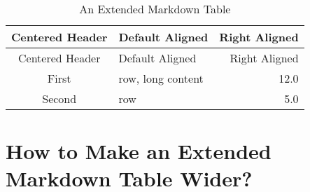 \documentclass[10pt, a4paper, oneside]{article}
\begin{document}
\begin{longtable}[c]{@{}clr@{}}
\caption{An Extended Markdown Table}\tabularnewline
\toprule
\begin{minipage}[b]{0.14\columnwidth}\centering\strut
Centered
Header
\strut\end{minipage} & \begin{minipage}[b]{0.11\columnwidth}\raggedright\strut
Default
Aligned
\strut\end{minipage} & \begin{minipage}[b]{0.11\columnwidth}\raggedleft\strut
Right
Aligned
\strut\end{minipage}\tabularnewline
\midrule
\endfirsthead
\toprule
\begin{minipage}[b]{0.14\columnwidth}\centering\strut
Centered
Header
\strut\end{minipage} & \begin{minipage}[b]{0.11\columnwidth}\raggedright\strut
Default
Aligned
\strut\end{minipage} & \begin{minipage}[b]{0.11\columnwidth}\raggedleft\strut
Right
Aligned
\strut\end{minipage}\tabularnewline
\midrule
\endhead
\begin{minipage}[t]{0.14\columnwidth}\centering\strut
First
\strut\end{minipage} & \begin{minipage}[t]{0.11\columnwidth}\raggedright\strut
row,
long
content
\strut\end{minipage} & \begin{minipage}[t]{0.11\columnwidth}\raggedleft\strut
12.0
\strut\end{minipage}\tabularnewline
\begin{minipage}[t]{0.14\columnwidth}\centering\strut
Second
\strut\end{minipage} & \begin{minipage}[t]{0.11\columnwidth}\raggedright\strut
row
\strut\end{minipage} & \begin{minipage}[t]{0.11\columnwidth}\raggedleft\strut
5.0
\strut\end{minipage}\tabularnewline
\bottomrule
\end{longtable}

\section{How to Make an Extended Markdown Table Wider?}\label{how-to-make-an-extended-markdown-table-wider}
\end{document}
